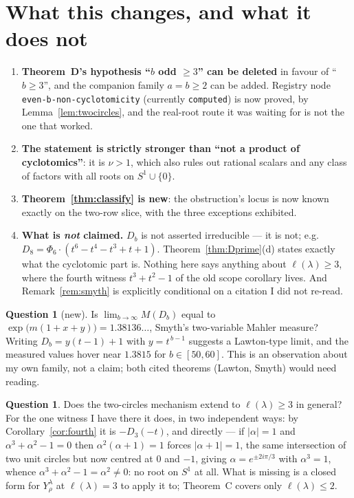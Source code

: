 \documentclass[11pt]{article}
\theoremstyle{definition}
\newtheorem{question}[theorem]{Question}
\newcommand{\lam}{\lambda}
\newcommand{\Scirc}{S^1}
\begin{document}
\section{What this changes, and what it does not}

\begin{enumerate}
\item \textbf{Theorem~D's hypothesis ``$b$ odd $\ge3$'' can be deleted} in favour of ``$b\ge3$'',
and the companion family $a=b\ge2$ can be added. Registry node
\texttt{even-b-non-cyclotomicity} (currently \texttt{computed}) is now proved, by
Lemma~\ref{lem:twocircles}, and the real-root route it was waiting for is not the one that worked.
\item \textbf{The statement is strictly stronger than ``not a product of cyclotomics''}: it is
$\nu>1$, which also rules out rational scalars and any class of factors with all roots on
$\Scirc\cup\{0\}$.
\item \textbf{Theorem~\ref{thm:classify} is new}: the obstruction's locus is now known exactly on
the two-row slice, with the three exceptions exhibited.
\item \textbf{What is \emph{not} claimed.} $D_b$ is not asserted irreducible --- it is not; e.g.\
$D_8=\Phi_6\cdot(t^{6}-t^{4}-t^{3}+t+1)$. Theorem~\ref{thm:Dprime}(d) states exactly what the
cyclotomic part is. Nothing here says anything about $\ell(\lam)\ge3$, where the fourth witness
$t^{3}+t^{2}-1$ of the old scope corollary lives. And Remark~\ref{rem:smyth} is explicitly
conditional on a citation I did not re-read.
\end{enumerate}

\begin{question}[new]\label{q:new}
Is $\lim_{b\to\infty}M(D_b)$ equal to $\exp\bigl(m(1+x+y)\bigr)=1.38136\ldots$, Smyth's
two-variable Mahler measure? Writing $D_b=y(t-1)+1$ with $y=t^{\,b-1}$ suggests a Lawton-type
limit, and the measured values hover near $1.3815$ for $b\in[50,60]$. This is an observation about
my own family, not a claim; both cited theorems (Lawton, Smyth) would need reading.
\end{question}

\begin{question}\label{q:slice3}
Does the two-circles mechanism extend to $\ell(\lam)\ge3$ in general? For the one witness I have
there it does, in two independent ways: by Corollary~\ref{cor:fourth} it is $-D_3(-t)$, and
directly --- if $|\alpha|=1$ and $\alpha^{3}+\alpha^{2}-1=0$ then $\alpha^{2}(\alpha+1)=1$ forces
$|\alpha+1|=1$, the same intersection of two unit circles but now centred at $0$ and $-1$, giving
$\alpha=e^{\pm2i\pi/3}$ with $\alpha^{3}=1$, whence $\alpha^{3}+\alpha^{2}-1=\alpha^{2}\ne0$:
no root on $\Scirc$ at all. What is missing is a closed form for $Y^{\lam}_{\rho}$ at
$\ell(\lam)=3$ to apply it to; Theorem~C covers only $\ell(\lam)\le2$.
\end{question}
\end{document}
